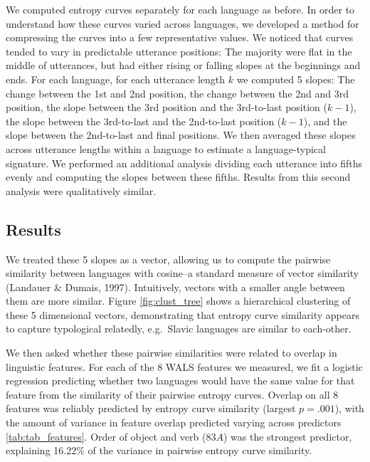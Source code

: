 \documentclass[10pt, letterpaper]{article}
\begin{document}
We computed entropy curves separately for each language as before. In
order to understand how these curves varied across languages, we
developed a method for compressing the curves into a few representative
values. We noticed that curves tended to vary in predictable utterance
positions: The majority were flat in the middle of utterances, but had
either rising or falling slopes at the beginnings and ends. For each
language, for each utterance length \(k\) we computed 5 slopes: The
change between the 1st and 2nd position, the change between the 2nd and
3rd position, the slope between the 3rd position and the 3rd-to-last
position (\(k-1\)), the slope between the 3rd-to-last and the
2nd-to-last position (\(k-1\)), and the slope between the 2nd-to-last
and final positions. We then averaged these slopes across utterance
lengths within a language to estimate a language-typical signature. We
performed an additional analysis dividing each utterance into fifths
evenly and computing the slopes between these fifths. Results from this
second analysis were qualitatively similar.

\subsection{Results}\label{results-2}

We treated these 5 slopes as a vector, allowing us to compute the
pairwise similarity between languages with cosine--a standard measure of
vector similarity (Landauer \& Dumais, 1997). Intuitively, vectors with
a smaller angle between them are more similar. Figure
\ref{fig:clust_tree} shows a hierarchical clustering of these 5
dimensional vectors, demonstrating that entropy curve similarity appears
to capture typological relatedly, e.g.~Slavic languages are similar to
each-other.

We then asked whether these pairwise similarities were related to
overlap in linguistic features. For each of the 8 WALS features we
measured, we fit a logistic regression predicting whether two languages
would have the same value for that feature from the similarity of their
pairwise entropy curves. Overlap on all 8 features was reliably
predicted by entropy curve similarity (largest \(p = .001\)), with the
amount of variance in feature overlap predicted varying across
predictors \ref{tab:tab_features}. Order of object and verb (\(83A\))
was the strongest predictor, explaining 16.22\% of the variance in
pairwise entropy curve similarity.
\end{document}
